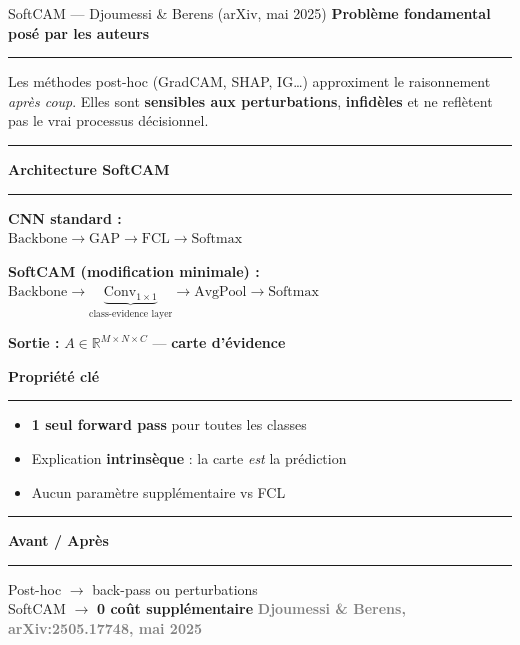 \documentclass[10pt]{beamer}
\newcommand{\source}[1]{\vspace{6pt}\hfill{\textcolor{gray}{\textbf{\tiny #1}}}}
\begin{document}
\begin{frame}{SoftCAM --- Djoumessi \& Berens (arXiv, mai 2025)}
	\textbf{Problème fondamental posé par les auteurs}
	\rule{\linewidth}{0.5pt}
	
	Les méthodes post-hoc (GradCAM, SHAP, IG\ldots) approximent le raisonnement \textit{après coup}.
	Elles sont \textbf{sensibles aux perturbations}, \textbf{infidèles} et ne reflètent pas
	le vrai processus décisionnel.
	\vspace{-0.5pt}
	\rule{\linewidth}{0.5pt}
	
	\vspace{4pt}
	
	\begin{minipage}{0.46\textwidth}
		\textbf{Architecture SoftCAM}
		\rule{\linewidth}{0.5pt}
		
		{\footnotesize
			\textbf{CNN standard :} \\
			$\text{Backbone} \to \text{GAP} \to \text{FCL} \to \text{Softmax}$
			
			\vspace{4pt}
			\textbf{SoftCAM (modification minimale) :} \\
			$\text{Backbone} \to \underbrace{\text{Conv}_{1\times1}}_{\text{class-evidence layer}} \to \text{AvgPool} \to \text{Softmax}$
			
			\textbf{Sortie :} $A \in \mathbb{R}^{M \times N \times C}$ --- \textbf{carte d'évidence}
		}
	\end{minipage}
	\hfill
	\begin{minipage}{0.51\textwidth}
		\textbf{Propriété clé}
		\rule{\linewidth}{0.5pt}
		{\small
			\begin{itemize}
				\item \textbf{1 seul forward pass} pour toutes les classes
				\item Explication \textbf{intrinsèque} : la carte \textit{est} la prédiction
				\item Aucun paramètre supplémentaire vs FCL
			\end{itemize}
		}
	\end{minipage}
	
	\vspace{-0.3pt}
	\rule{\linewidth}{0.5pt}
	
	
	\textbf{Avant / Après}
	\vspace{-0.5pt}
	\rule{\linewidth}{0.5pt}
	
	{\small
		Post-hoc $\to$ back-pass ou perturbations \\
		SoftCAM $\to$ \textbf{0 coût supplémentaire}
	}
	\source{Djoumessi \& Berens, arXiv:2505.17748, mai 2025}
\end{frame}
\end{document}
